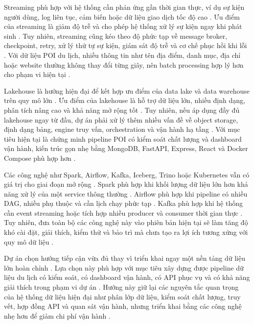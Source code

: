 Streaming phù hợp với hệ thống cần phản ứng gần thời gian thực, ví dụ sự kiện người dùng, log liên tục, cảm biến hoặc dữ liệu giao dịch tốc độ cao \cite{awsStreaming}. Ưu điểm của streaming là giảm độ trễ và cho phép hệ thống xử lý sự kiện ngay khi phát sinh \cite{awsStreaming}. Tuy nhiên, streaming cũng kéo theo độ phức tạp về message broker, checkpoint, retry, xử lý thứ tự sự kiện, giám sát độ trễ và cơ chế phục hồi khi lỗi \cite{awsStreaming}. Với dữ liệu POI du lịch, nhiều thông tin như tên địa điểm, danh mục, địa chỉ hoặc website thường không thay đổi từng giây, nên batch processing hợp lý hơn cho phạm vi hiện tại \cite{ibmETL}.\par

Lakehouse là hướng hiện đại để kết hợp ưu điểm của data lake và data warehouse trên quy mô lớn \cite{armbrust2021}. Ưu điểm của lakehouse là hỗ trợ dữ liệu lớn, nhiều định dạng, phân tích nâng cao và khả năng mở rộng tốt \cite{armbrust2021}. Tuy nhiên, nếu áp dụng đầy đủ lakehouse ngay từ đầu, dự án phải xử lý thêm nhiều vấn đề về object storage, định dạng bảng, engine truy vấn, orchestration và vận hành hạ tầng \cite{armbrust2021}. Với mục tiêu hiện tại là chứng minh pipeline POI có kiểm soát chất lượng và dashboard vận hành, kiến trúc gọn nhẹ bằng MongoDB, FastAPI, Express, React và Docker Compose phù hợp hơn \cite{dockerCompose}.\par

Các công nghệ như Spark, Airflow, Kafka, Iceberg, Trino hoặc Kubernetes vẫn có giá trị cho giai đoạn mở rộng \cite{sparkDocs}. Spark phù hợp khi khối lượng dữ liệu lớn hơn khả năng xử lý của một service thông thường \cite{sparkDocs}. Airflow phù hợp khi pipeline có nhiều DAG, nhiều phụ thuộc và cần lịch chạy phức tạp \cite{airflowDocs}. Kafka phù hợp khi hệ thống cần event streaming hoặc tích hợp nhiều producer và consumer thời gian thực \cite{awsStreaming}. Tuy nhiên, đưa toàn bộ các công nghệ này vào phiên bản hiện tại sẽ làm tăng độ khó cài đặt, giải thích, kiểm thử và bảo trì mà chưa tạo ra lợi ích tương xứng với quy mô dữ liệu \cite{dockerCompose}.\par


Dự án chọn hướng tiếp cận vừa đủ thay vì triển khai ngay một nền tảng dữ liệu lớn hoàn chỉnh \cite{armbrust2021}. Lựa chọn này phù hợp với mục tiêu xây dựng được pipeline dữ liệu du lịch có kiểm soát, có dashboard vận hành, có API phục vụ và có khả năng giải thích trong phạm vi dự án \cite{ibmETL}. Hướng này giữ lại các nguyên tắc quan trọng của hệ thống dữ liệu hiện đại như phân lớp dữ liệu, kiểm soát chất lượng, truy vết, hợp đồng API và quan sát vận hành, nhưng triển khai bằng các công nghệ nhẹ hơn để giảm chi phí vận hành \cite{damaDmbok}.\par

